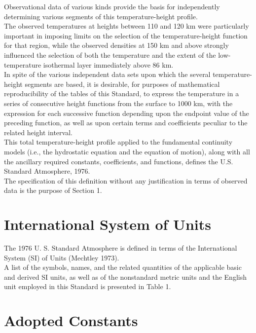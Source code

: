 \documentclass{article}
\begin{document}
Observational data of various kinds provide the basis for independently determining various segments of this temperature-height profile.\\
The observed temperatures at heights between 110 and 120 km were particularly important in imposing limits on the selection of the temperature-height function for that region, while the observed densities at 150 km and above strongly influenced the selection of both the temperature and the extent of the low-temperature isothermal layer immediately above 86 km.\\

In spite of the various independent data sets upon which the several temperature-height segments are based, it is desirable, for purposes of mathematical reproducibility of the tables of this Standard, to express the temperature in a series of consecutive height functions from the surface to 1000 km, with the expression for each successive function depending upon the endpoint value of the preceding function, as well as upon certain terms and coefficients peculiar to the related height interval.\\

This total temperature-height profile applied to the fundamental continuity models (i.e., the hydrostatic equation and the equation of motion), along with all the ancillary required constants, coefficients, and functions, defines the U.S. Standard Atmosphere, 1976.\\
The specification of this definition without any justification in terms of observed data is the purpose of Section 1.\\

\section{International System of Units}

The 1976 U. S. Standard Atmosphere is defined in terms of the International System (SI) of Units (Mechtley 1973). \\

A list of the symbols, names, and the related quantities of the applicable basic and derived SI units, as well as of the nonstandard metric units and the English unit employed in this Standard is presented in Table 1.\\

\section{Adopted Constants}
\end{document}
